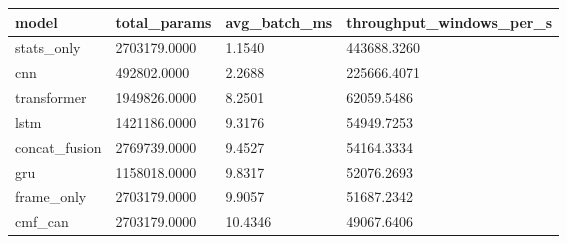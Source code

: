\begin{tabular}{llll}
\toprule
model & total\_params & avg\_batch\_ms & throughput\_windows\_per\_s \\
\midrule
stats\_only & 2703179.0000 & 1.1540 & 443688.3260 \\
cnn & 492802.0000 & 2.2688 & 225666.4071 \\
transformer & 1949826.0000 & 8.2501 & 62059.5486 \\
lstm & 1421186.0000 & 9.3176 & 54949.7253 \\
concat\_fusion & 2769739.0000 & 9.4527 & 54164.3334 \\
gru & 1158018.0000 & 9.8317 & 52076.2693 \\
frame\_only & 2703179.0000 & 9.9057 & 51687.2342 \\
cmf\_can & 2703179.0000 & 10.4346 & 49067.6406 \\
\bottomrule
\end{tabular}
